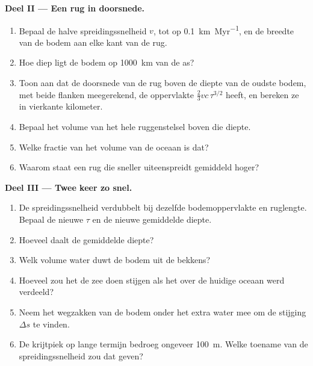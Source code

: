 \begin{problem}
\noindent\textbf{Deel II --- Een rug in doorsnede.}
\begin{enumerate}[resume]
  \item Bepaal de halve spreidingssnelheid $v$, tot op \qty{0.1}{km.Myr^{-1}}, en de breedte
        van de bodem aan elke kant van de rug.
  \item Hoe diep ligt de bodem op \qty{1000}{km} van de as?
  \item Toon aan dat de doorsnede van de rug boven de diepte van de oudste bodem, met
        beide flanken meegerekend, de oppervlakte $\tfrac23 v c\,\tau^{3/2}$ heeft, en bereken ze in
        vierkante kilometer.
  \item Bepaal het volume van het hele ruggenstelsel boven die diepte.
  \item Welke fractie van het volume van de oceaan is dat?
  \item Waarom staat een rug die sneller uiteenspreidt gemiddeld hoger?
\end{enumerate}

\noindent\textbf{Deel III --- Twee keer zo snel.}
\begin{enumerate}[resume]
  \item De spreidingssnelheid verdubbelt bij dezelfde bodemoppervlakte en ruglengte. Bepaal de nieuwe $\tau$
        en de nieuwe gemiddelde diepte.
  \item Hoeveel daalt de gemiddelde diepte?
  \item Welk volume water duwt de bodem uit de bekkens?
  \item Hoeveel zou het de zee doen stijgen als het over de huidige oceaan werd verdeeld?
  \item Neem het wegzakken van de bodem onder het extra water mee om de stijging $\Delta s$ te vinden.
  \item De krijtpiek op lange termijn bedroeg ongeveer \qty{100}{m}. Welke toename van de spreidingssnelheid
        zou dat geven?
\end{enumerate}


\end{problem}
